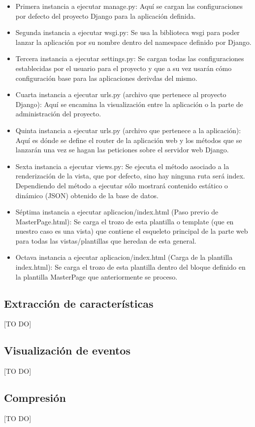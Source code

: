 \begin{itemize}
\item Primera instancia a ejecutar manage.py: Aquí se cargan las configuraciones por defecto del proyecto Django para la aplicación definida.
\item Segunda instancia a ejecutar wsgi.py: Se usa la biblioteca wsgi para poder lanzar la aplicación por su nombre dentro del namespace definido por Django.
\item Tercera instancia a ejecutar settings.py: Se cargan todas las configuraciones establecidas por el usuario para el proyecto y que a su vez usarán cómo configuración base para las aplicaciones derivdas del mismo.
\item Cuarta instancia a ejecutar urls.py (archivo que pertenece al proyecto Django): Aquí se encamina la visualización entre la aplicación o la parte de administración del proyecto.
\item Quinta instancia a ejecutar urls.py (archivo que pertenece a la aplicación): Aquí es dónde se define el router de la aplicación web y los métodos que se lanzarán una vez se hagan las peticiones sobre el servidor web Django.
\item Sexta instancia a ejecutar views.py: Se ejecuta el método asociado a la renderización de la vista, que por defecto, sino hay ninguna ruta será index. Dependiendo del método a ejecutar sólo mostrará contenido estático o dinámico (JSON) obtenido de la base de datos.
\item Séptima instancia a ejecutar aplicacion/index.html (Paso previo de MasterPage.html): Se carga el trozo de esta plantilla o template (que en nuestro caso es una vista) que contiene el esqueleto principal de la parte web para todas las vistas/plantillas que heredan de esta general.
\item Octava instancia a ejecutar aplicacion/index.html (Carga de la plantilla index.html): Se carga el trozo de esta plantilla dentro del bloque definido en la plantilla MasterPage que anteriormente se proceso.
\end{itemize}

\subsection{Extracción de características}
[TO DO]
\subsection{Visualización de eventos}
[TO DO]
\subsection{Compresión}

[TO DO]
